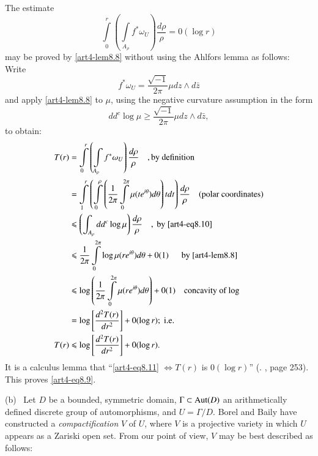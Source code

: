 \begin{remark}
The estimate
\setcounter{equation}{8}
\begin{equation}
\int\limits^r_0 \left(\int\limits_{A_\rho} f^\ast \omega_U \right) \frac{d \rho}{\rho} = 0 (\log r)
\label{art4-eq8.9}
\end{equation}
may be proved by \eqref{art4-lem8.8} without using the Ahlfors lemma as follows: Write
$$
f^\ast \omega_U = \frac{\sqrt{-1}}{2\pi} \mu d z \wedge d \bar{z}
$$
and apply \eqref{art4-lem8.8} to $\mu$, using the negative curvature assumption in the form 
\begin{equation}
dd^c \log \mu \geqslant \frac{\sqrt{-1}}{2\pi} \mu dz \wedge d \bar{z}, \label{art4-eq8.10}
\end{equation}
to obtain:
\begin{align}
T(r) & = \int\limits^r_0 \left(\int\limits_{A_\rho} f^{\ast} \omega_U \right) \frac{d \rho}{\rho} \quad, \text{by definition} \notag\\
& = \int\limits^r_1 \left(\int\limits^\rho_0 \left(\frac{1}{2\pi} \int\limits^{2\pi}_0 \mu (te^{i\theta}) d \theta \right) t d t \right) \frac{d\rho}{\rho} \quad \text{(polar coordinates)} \notag\\
& \leqslant \left(\int_{A_\rho} dd^c \log \mu \right) \frac{d \rho}{ \rho} \quad, \text{ by \eqref{art4-eq8.10}}\notag\\
& \leqslant \frac{1}{2\pi} \int\limits^{2\pi}_0 \log \mu (re^{i\theta}) d \theta + 0 (1) \quad \text{~ by \eqref{art4-lem8.8}} \notag\\
& \leqslant \log \left(\frac{1}{2\pi} \int\limits^{2\pi}_0  \mu (re^{i\theta}) d\theta \right) + 0 (1) \quad  \text{concavity of log} \notag\\
& = \log \left[\frac{d^2 T (r)}{dr^2}\right] + 0 (\log r); \; \text{{i.e.}\kern.3em}\notag\\
T(r) & \leqslant \log \left[\frac{d^2 T (r)}{dr^2} \right] + 0 (\log r). \label{art4-eq8.11}
\end{align}
It is a calculus lemma that ``\eqref{art4-eq8.11} $\Leftrightarrow T (r)$ is $0 (\log r)$'' (\cf. \cite{art4-key38}, page 253). This proves \eqref{art4-eq8.9}.
\end{remark}

\noindent
(b)~  Let $D$ be a bounded, symmetric domain, $\Gamma \subset \operatorname{Aut} (D)$  an arithmetically defined discrete group of automorphisms, and $U =\Gamma / D$. Borel and Baily \cite{art4-key2} have constructed a \textit{compactification} $V$ of $U$, where $V$ is a projective variety in which $U$ appears as a Zariski open set. From our point of view, $V$ may be best described as follows:

